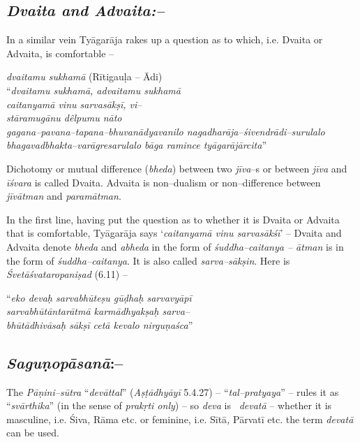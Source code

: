 \subsection*{\textit{Dvaita and Advaita:–}}

In a similar vein Tyāgarāja rakes up a question as to which, i.e. Dvaita or Advaita, is comfortable –

\begin{myquote}
\textit{dvaitamu sukhamā} (Rītigauḷa – Ādi)\\ “\textit{dvaitamu sukhamā, advaitamu sukhamā}\\\textit{caitanyamā vinu sarvasākṣī, vi–}\\\textit{stāramugānu dêlpumu nāto}\\\textit{gagana–pavana–tapana–bhuvanādyavanilo nagadharāja–śivendrādi–surulalo}\\\textit{bhagavadbhakta–varāgresarulalo bāga ramince tyāgarājārcita}”
\end{myquote}

Dichotomy or mutual difference (\textit{bheda}) between two \textit{jīva}–s or between \textit{jīva} and \textit{īśvara} is called Dvaita. Advaita is non–dualism or non–difference between \textit{jīvātman} and \textit{paramātman}. 

In the first line, having put the question as to whether it is Dvaita or Advaita that is comfortable, Tyāgarāja says ‘\textit{caitanyamā vinu sarvasākśī}’ – Dvaita and Advaita denote \textit{bheda} and \textit{abheda} in the form of \textit{śuddha–caitanya – ātman} is in the form of \textit{śuddha–caitanya}. It is also called \textit{sarva–sākṣin}. Here is \textit{Śvetāśvataropaniṣad} (6.11) –

\begin{myquote}
“\textit{eko devaḥ sarvabhūteṣu gūḍhaḥ sarvavyāpī}\\\textit{sarvabhūtāntarātmā karmādhyakṣaḥ sarva–}\\\textit{bhūtādhivāsaḥ sākṣī cetā kevalo nirguṇaśca}”
\end{myquote}

\vspace{-.3cm}

\subsection*{\textit{Saguṇopāsanā}:–}

The \textit{Pāṇini–sūtra} “\textit{devāttal}” (\textit{Aṣṭādhyāyī} 5.4.27) – “\textit{tal–pratyaya}” – rules it as “\textit{svārthika}” (in the sense of \textit{prakṛti only}) – so \textit{deva} is  \textit{devatā} – whether it is masculine, i.e. Śiva, Rāma etc. or feminine, i.e. Sītā\textit{,} Pārvatī etc. the term \textit{devatā} can be used. 

